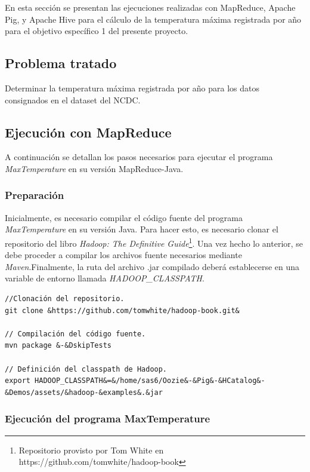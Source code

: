 En esta sección se presentan las ejecuciones realizadas con MapReduce, Apache Pig, y Apache Hive para el cálculo de la temperatura máxima registrada por año para el objetivo específico 1 del presente proyecto.

\subsection{Problema tratado}

Determinar la temperatura máxima registrada por año para los datos consignados en el dataset del NCDC.


\subsection{Ejecución con MapReduce}

A continuación se detallan los pasos necesarios para ejecutar el programa \textit{MaxTemperature} en su versión MapReduce-Java. \\

\subsubsection{Preparación}

Inicialmente, es necesario compilar el código fuente del programa \textit{MaxTemperature} en su versión Java. Para hacer esto, es necesario clonar el repositorio del libro \textit{Hadoop: The Definitive Guide}\footnote{Repositorio provisto por Tom White en https://github.com/tomwhite/hadoop-book}. Una vez hecho lo anterior, se debe proceder a compilar los archivos fuente necesarios mediante \textit{Maven}.Finalmente, la ruta del archivo .jar compilado deberá establecerse en una variable de entorno llamada \textit{HADOOP\_CLASSPATH}. 

\begin{lstlisting}[linewidth=\columnwidth,breaklines=true]
//Clonación del repositorio.
git clone &https://github.com/tomwhite/hadoop-book.git&

// Compilación del código fuente.
mvn package &-&DskipTests

// Definición del classpath de Hadoop.
export HADOOP_CLASSPATH&=&/home/sas6/Oozie&-&Pig&-&HCatalog&-&Demos/assets/&hadoop-&examples&.&jar
\end{lstlisting}


\subsubsection{Ejecución del programa MaxTemperature}

